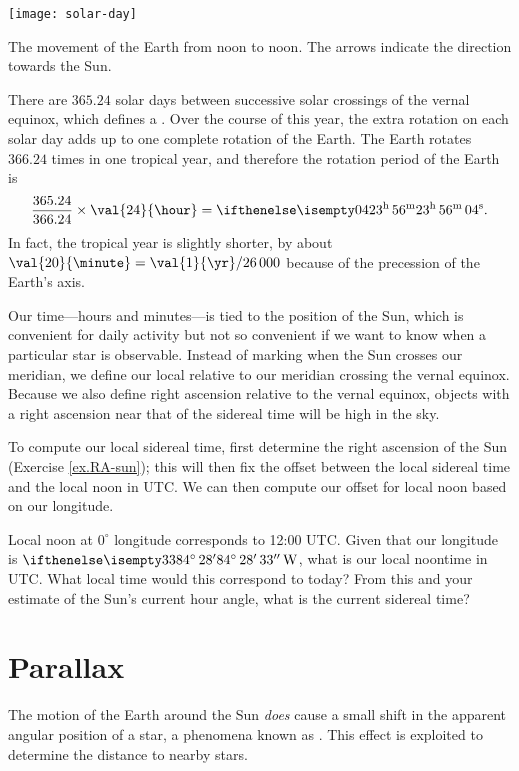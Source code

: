 \begin{marginfigure}
\texttt{[image: solar-day]}
\caption[The movement of the Earth from noon to noon]{The movement of the Earth from noon to noon.  The arrows indicate the direction towards the Sun.}
\label{f.solar-day}
\end{marginfigure}

There are $365.24$ solar days between successive solar crossings of the vernal equinox, which defines a .  Over the course of this year, the extra rotation on each solar day adds up to one complete rotation of the Earth.  The Earth rotates $366.24$ times in one tropical year, and therefore the rotation period of the Earth is
\[ \frac{365.24}{366.24}\times \val{24}{\hour} =  \hrangle{23}{56}{04}.  \]
In fact, the tropical year is slightly shorter, by about $\val{20}{\minute} = \val{1}{\yr}/26\,000$ because of the precession of the Earth's axis.

Our time---hours and minutes---is tied to the position of the Sun, which is convenient for daily activity but not so convenient if we want to know when a particular star is observable.  Instead of marking when the Sun crosses our meridian, we define our local  relative to our meridian crossing the vernal equinox.  Because we also define right ascension relative to the vernal equinox, objects with a right ascension near that of the sidereal time will be high in the sky.

To compute our local sidereal time, first determine the right ascension of the Sun (Exercise \ref{ex.RA-sun}); this will then fix the offset between the local sidereal time and the local noon in UTC.  We can then compute our offset for local noon based on our longitude.

\begin{exercisebox}
Local noon at $0^{\circ}$ longitude corresponds to 12:00 UTC. Given that our longitude is $\dec{84}{28}{33}\,\mathrm{W}$, what is our local noontime in UTC.  What local time would this correspond to today? From this and your estimate of the Sun's current hour angle, what is the current sidereal time?
\end{exercisebox}

\section{Parallax}

The motion of the Earth around the Sun \emph{does} cause a small shift in the apparent angular position of a star, a phenomena known as .  This effect is exploited to determine the distance to nearby stars.  


